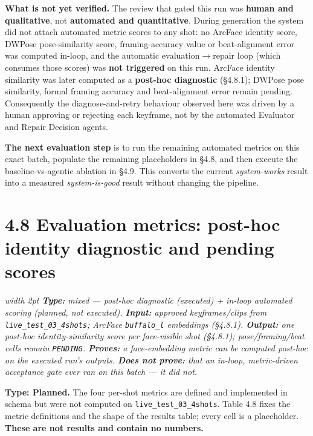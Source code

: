 \documentclass[10pt,twocolumn,letterpaper]{article}
\newenvironment{quotebox}%
 {\par\vspace{3pt}\noindent\begin{list}{}{\setlength{\leftmargin}{1em}\setlength{\rightmargin}{0.5em}}\item\footnotesize\itshape\color{black!80}\hspace*{-0.6em}\vrule width 2pt\hspace{0.6em}\ignorespaces}%
 {\end{list}\vspace{3pt}}
\begin{document}
\textbf{What is not yet verified.} The review that gated this run was \textbf{human and qualitative}, not \textbf{automated and quantitative}. During generation the system did not attach automated metric scores to any shot: no ArcFace identity score, DWPose pose-similarity score, framing-accuracy value or beat-alignment error was computed in-loop, and the automatic evaluation$\rightarrow$repair loop (which consumes those scores) was \textbf{not triggered} on this run. ArcFace identity similarity was later computed as a \textbf{post-hoc diagnostic} (\S{}4.8.1); DWPose pose similarity, formal framing accuracy and beat-alignment error remain pending. Consequently the diagnose-and-retry behaviour observed here was driven by a human approving or rejecting each keyframe, not by the automated Evaluator and Repair Decision agents.

\textbf{The next evaluation step} is to run the remaining automated metrics on this exact batch, populate the remaining placeholders in \S{}4.8, and then execute the baseline-vs-agentic ablation in \S{}4.9. This converts the current \emph{system-works} result into a measured \emph{system-is-good} result without changing the pipeline.


\section*{4.8 Evaluation metrics: post-hoc identity diagnostic and pending scores}

\begin{quotebox}
\textbf{Type:} mixed --- post-hoc diagnostic (executed) + in-loop automated scoring (planned, not executed). \quad \textbf{Input:} approved keyframes/clips from \texttt{live\_test\_03\_4shots}; ArcFace \texttt{buffalo\_l} embeddings (\S{}4.8.1). \quad \textbf{Output:} one post-hoc identity-similarity score per face-visible shot (\S{}4.8.1); pose/framing/beat cells remain \texttt{PENDING}. \quad \textbf{Proves:} a face-embedding metric can be computed post-hoc on the executed run's outputs. \quad \textbf{Does not prove:} that an in-loop, metric-driven acceptance gate ever ran on this batch --- it did not.
\end{quotebox}

\textbf{Type: Planned.} The four per-shot metrics are defined and implemented in schema but were not computed on \texttt{live\_test\_03\_4shots}. Table 4.8 fixes the metric definitions and the shape of the results table; every cell is a placeholder. \textbf{These are not results and contain no numbers.}
\end{document}
